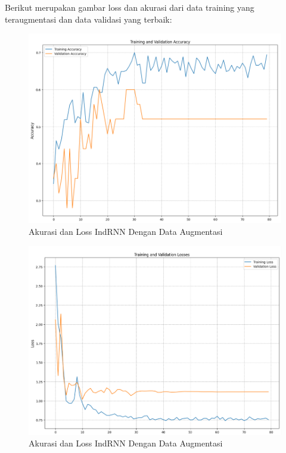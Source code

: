 \newpage
Berikut merupakan gambar loss dan akurasi dari data training yang teraugmentasi dan
data validasi yang terbaik:
\begin{figure} [H] \centering
  \includegraphics[scale=0.6]{gambar/AccIndRNNAug.png}
  \caption{Akurasi dan Loss IndRNN Dengan Data Augmentasi}
  \label{fig:AccIndRNNaug}
\end{figure}

\begin{figure} [H] \centering
  \includegraphics[scale=0.6]{gambar/LossIndRNNAug.png}
  \caption{Akurasi dan Loss IndRNN Dengan Data Augmentasi}
  \label{fig:LossIndRNNaug}
\end{figure}

